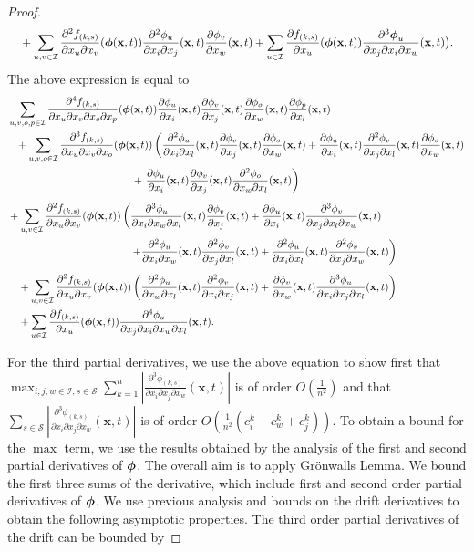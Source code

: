 \documentclass[acmsmall]{acmart}
\newcommand\bx{\mathbf{x}}
\newcommand\bphi{\text{\boldmath$\phi$}}
\newcommand\calI{\mathcal{I}}
\newcommand\calS{\mathcal{S}}
\newcommand\abs[1]{\left|#1\right|}         %
\newcommand{\dddd}[5]{ \frac{\partial^4 #1 }{ \partial x_{#2} \partial x_{#3} \partial x_{#4} \partial x_{#5} }}
\newcommand{\ddd}[4]{ \frac{\partial^3 #1 }{ \partial x_{#2} \partial x_{#3} \partial x_{#4} }}
\newcommand{\dd}[3]{ \frac{\partial^2 #1 }{ \partial x_{#2} \partial x_{#3}}}
\begin{document}
\begin{proof}
\begin{align*}
& \quad + \sum_{u,v \in \calI} \dd{f_{(k,s)}}{u}{v}(\bphi (\bx,t)) \dd{\phi_{u}}{i}{j}(\bx,t) \frac{\partial \phi_{v}}{\partial x_w}(\bx,t) + \sum_{u \in \calI} \frac{\partial f_{(k,s)}}{\partial x_u}(\bphi (\bx,t)) \ddd{\bphi_{u}}{j}{i}{w}(\bx,t) \bigr).
\end{align*}
The above expression is equal to
\begin{align*}
& \sum_{u,v,o,p\in \calI} \dddd{f_{(k,s)}}{u}{v}{o}{p}(\bphi (\bx,t)) \frac{\partial \phi_{u}}{\partial x_i}(\bx,t) \frac{\partial \phi_{v}}{\partial x_j}(\bx,t) \frac{\partial \phi_{o}}{\partial x_w}(\bx,t)\frac{\partial \phi_{p}}{\partial x_l}(\bx,t)  \\
& \phantom{= }+ \sum_{u,v,o \in \calI} \ddd{f_{(k,s)}}{u}{v}{o}(\bphi (\bx,t)) \left( \dd{\phi_{u}}{i}{l}(\bx,t) \frac{\partial \phi_{v}}{\partial x_j}(\bx,t) \frac{\partial \phi_{o}}{\partial x_w}(\bx,t) + \frac{\partial \phi_{u}}{\partial x_i}(\bx,t) \dd{\phi_{v}}{j}{l}(\bx,t) \frac{\partial \phi_{o}}{\partial x_w}(\bx,t) \right. \\ 
& \phantom{\sum_{u,v,o \in \calI} \ddd{f_{(k,s)}}{u}{v}{o}(\bphi (\bx,t))} + \left. \frac{\partial \phi_{u}}{\partial x_i}(\bx,t) \frac{\partial \phi_{v}}{\partial x_j}(\bx,t) \dd{\phi_{o}}{w}{l}(\bx,t)\right)\\
& + \sum_{u,v \in \calI} \dd{f_{(k,s)}}{u}{v}(\bphi (\bx,t)) \left( \ddd{\phi_{u}}{i}{w}{l}(\bx,t) \frac{\partial \phi_{v}}{\partial x_j}(\bx,t) + \frac{\partial \phi_{u}}{\partial x_i}(\bx,t) \ddd{\phi_{v}}{j}{l}{w}(\bx,t) \right. \\
& \quad \phantom{\sum_{u,v \in \calI 123}  \dd{f_{(k,s)}}{u}{v}(\phi (\bx,t))}  \left. + \dd{\phi_{u}}{i}{w}(\bx,t) \dd{\phi_{v}}{j}{l}(\bx,t) + \dd{\phi_{u}}{i}{l}(\bx,t) \dd{\phi_{v}}{j}{w}(\bx,t) \right) \\
& \quad + \sum_{u,v \in \calI} \dd{f_{(k,s)}}{u}{v} (\bphi (\bx,t)) \left( \dd{\phi_{u}}{w}{l}(\bx,t) \dd{\phi_{v}}{i}{j}(\bx,t) + \frac{\partial \phi_{v}}{\partial x_w}(\bx,t) \ddd{\phi_{u}}{i}{j}{l}(\bx,t) \right) \\
& \quad + \sum_{u \in \calI} \frac{\partial f_{(k,s)}}{\partial x_u}(\bphi (\bx,t)) \dddd{\phi_{u}}{j}{i}{w}{l}(\bx,t).
\end{align*}
\color{black}

For the third partial derivatives, we use the above equation to show first that \\$\max_{i,j,w \in \calI,s \in \calS} \sum_{k=1}^{n} \abs{\ddd{\phi_{(k,s)}}{i}{j}{w}(\bx,t)}$ is of order $O(\frac{1}{n^2})$ and that $\sum_{s\in \calS} \abs{\ddd{\phi_{(k,s)}}{i}{j}{w}(\bx,t)}$ is of order $O\left( \frac{1}{n^2}(c^k_{i} + c^k_{w} + c^k_{j}) \right)$. To obtain a bound for the $\max$ term, we use the results obtained by the analysis of the first and second partial derivatives of $\bphi$. The overall aim is to apply Grönwalls Lemma. 
We bound the first three sums of the derivative, which include first and second order partial derivatives of $\bphi$. We use previous analysis and bounds on the drift derivatives to obtain the following asymptotic properties. The third order partial derivatives of the drift can be bounded by 


\end{proof}
\end{document}
